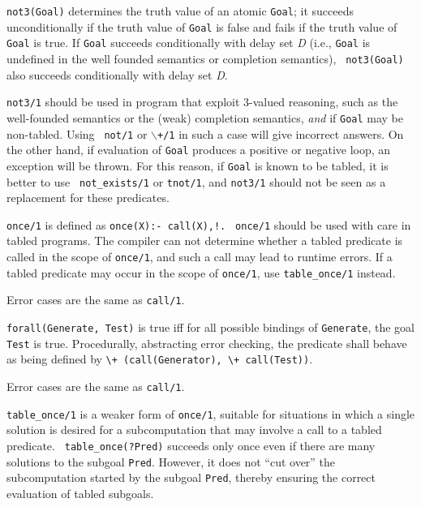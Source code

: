 \begin{description}
\begin{itemize}
\label{not3}
% 
{\tt not3(Goal)} determines the truth value of an atomic {\tt Goal};
it succeeds unconditionally if the truth value of {\tt Goal} is false
and fails if the truth value of {\tt Goal} is true.  If {\tt Goal}
succeeds conditionally with delay set {\em D} (i.e., {\tt Goal} is
undefined in the well founded semantics or completion semantics), {\tt
  not3(Goal)} also succeeds conditionally with delay set {\em D}.

{\tt not3/1} should be used in program that exploit 3-valued
reasoning, such as the well-founded semantics or the (weak) completion
semantics, {\em and} if {\tt Goal} may be non-tabled.  Using {\tt
  not/1} or {\tt $\backslash$+/1} in such a case will give incorrect
answers.  On the other hand, if evaluation of {\tt Goal} produces a
positive or negative loop, an exception will be thrown.  For this
reason, if {\tt Goal} is known to be tabled, it is better to use {\tt
  not\_exists/1} or {\tt tnot/1}, and {\tt not3/1} should not be seen
as a replacement for these predicates.


%
    {\tt once/1} is defined as {\tt once(X):- call(X),!.}  {\tt
    once/1} should be used with care in tabled programs.  The compiler
    can not determine whether a tabled predicate is called in the
    scope of {\tt once/1}, and such a call may lead to runtime errors.
    If a tabled predicate may occur in the scope of {\tt once/1}, use
    {\tt table\_once/1} instead.

    Error cases are the same as {\tt call/1}.

%
{\tt forall(Generate, Test)} is true iff for all possible bindings of
{\tt Generate}, the goal {\tt Test} is true. Procedurally, abstracting
error checking, the predicate shall behave as being defined by 
\verb|\+ (call(Generator), \+ call(Test))|.

    Error cases are the same as {\tt call/1}.

    {\tt table\_once/1} is a weaker form of {\tt once/1}, suitable for
    situations in which a single solution is desired for a
    subcomputation that may involve a call to a tabled predicate.  {\tt
    table\_once(?Pred)} succeeds only once even if there are many
    solutions to the subgoal {\tt Pred}.  However, it does not ``cut
    over'' the subcomputation started by the subgoal {\tt Pred},
    thereby ensuring the correct evaluation of tabled subgoals.


\end{itemize}
\end{description}

